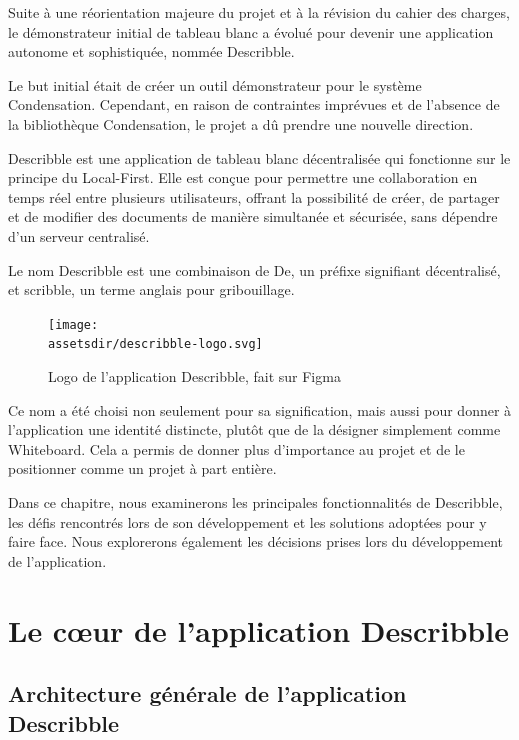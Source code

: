 Suite à une réorientation majeure du projet et à la révision du cahier des charges, le démonstrateur initial de tableau blanc a évolué pour devenir une application autonome et sophistiquée, nommée \gls{Describble}.

Le but initial était de créer un outil démonstrateur pour le système Condensation. Cependant, en raison de contraintes imprévues et de l'absence de la bibliothèque Condensation, le projet a dû prendre une nouvelle direction.

\gls{Describble} est une application de tableau blanc décentralisée qui fonctionne sur le principe du \guillemotleft Local-First\guillemotright. Elle est conçue pour permettre une collaboration en temps réel entre plusieurs utilisateurs, offrant la possibilité de créer, de partager et de modifier des documents de manière simultanée et sécurisée, sans dépendre d'un serveur centralisé.

Le nom \gls{Describble} est une combinaison de \guillemotleft De\guillemotright, un préfixe signifiant décentralisé, et \guillemotleft scribble\guillemotright, un terme anglais pour gribouillage.

\begin{figure}[h]
    \centering
    \texttt{[image: \\assetsdir/describble-logo.svg]}
    \caption{Logo de l'application \gls{Describble}, fait sur Figma}
\end{figure}

Ce nom a été choisi non seulement pour sa signification, mais aussi pour donner à l'application une identité distincte, plutôt que de la désigner simplement comme \guillemotleft Whiteboard\guillemotright. Cela a permis de donner plus d'importance au projet et de le positionner comme un projet à part entière.

Dans ce chapitre, nous examinerons les principales fonctionnalités de \gls{Describble}, les défis rencontrés lors de son développement et les solutions adoptées pour y faire face. Nous explorerons également les décisions prises lors du développement de l'application.


\section{Le c\oe{}ur de l'application Describble}

\subsection{Architecture générale de l'application Describble}

